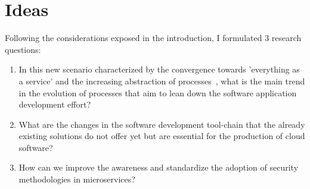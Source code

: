 \documentclass[a4paper, 10pt, conference]{ieeeconf}
\begin{document}
\section{Ideas}

Following the considerations exposed in the introduction, I formulated 3 research questions:
\begin{enumerate}
 	\item In this new scenario characterized by the convergence towards 'everything as a service' and the increasing abstraction of processes~\cite{automatic-dev}, what is the main trend in the evolution of processes that aim to lean down the software application development effort?
 	\item What are the changes in the software development tool-chain that the already existing solutions do not offer yet but are essential for the production of cloud software? 
	\item How can we improve the awareness and standardize the adoption of security methodologies in microservices?
\end{enumerate}





\end{document}
